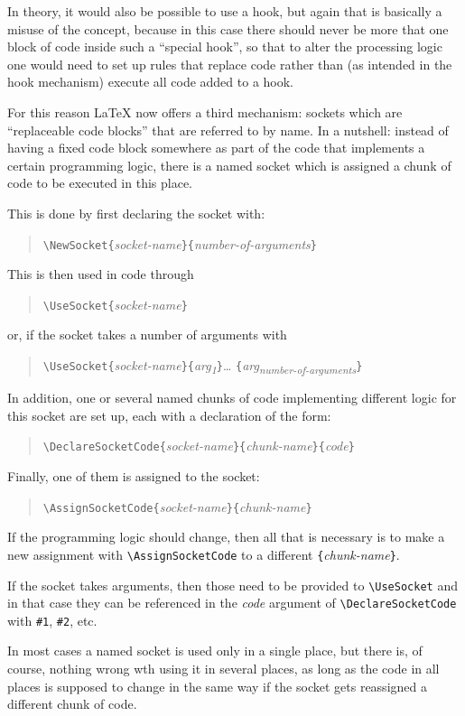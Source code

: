 \documentclass{article}
\newcommand\cs[1]{\texttt{\textbackslash #1}}
\newcommand\meta[1]{\textlangle\textit{#1}\textrangle}
\newcommand\marg[1]{\texttt\{\meta{#1}\texttt\}}
\begin{document}
In theory, it would also be possible to use a hook, but again that is
basically a misuse of the concept, because in this case there should
never be more that one block of code inside such a  \enquote{special hook}, so that to alter
the processing logic one would need to set up rules that replace code
rather than (as intended in the hook mechanism) execute all code added to a hook.



For this reason \LaTeX{} now offers a third mechanism: sockets
which are \enquote{replaceable code blocks} that are referred to by name.
%
In a nutshell: instead of having a fixed code block somewhere as part
of the code that implements a certain programming logic, there is a named socket
which is assigned a chunk of code to be executed in this place.

This is done by first declaring the socket with:
\begin{quote}
\cs{NewSocket}\marg{socket-name}\marg{number-of-arguments}
\end{quote}
This is then used in code through
\begin{quote}
 \cs{UseSocket}\marg{socket-name}
\end{quote}
or, if the socket takes a number of arguments with
\begin{quote}
  \cs{UseSocket}\marg{socket-name}\marg{arg\textsubscript{1}}\ldots
  \marg{arg\textsubscript{number-of-arguments}}
\end{quote}

In addition, one or several named chunks of code implementing different logic for this
socket are set up, each with a declaration of the form:
\begin{quote}
  \cs{DeclareSocketCode}\marg{socket-name}\marg{chunk-name}\marg{code}
\end{quote}
Finally,
one of them is assigned to the socket:
\begin{quote}
\cs{AssignSocketCode}\marg{socket-name}\marg{chunk-name}
\end{quote}
If the programming logic should change, then all that is necessary is
to make a new assignment with \cs{AssignSocketCode} to a different
\marg{chunk-name}.

If the socket takes arguments, then those need to be provided to
\cs{UseSocket} and in that case they can be referenced in the \meta{code}
argument of \cs{DeclareSocketCode} with \verb=#1=, \verb=#2=, etc.

In most cases a named socket is used only in a single place, but there
is, of course, nothing wrong wth using it in several places, as long
as the code in all places is supposed to change in the same way if the socket gets reassigned a different chunk of code.
\end{document}
